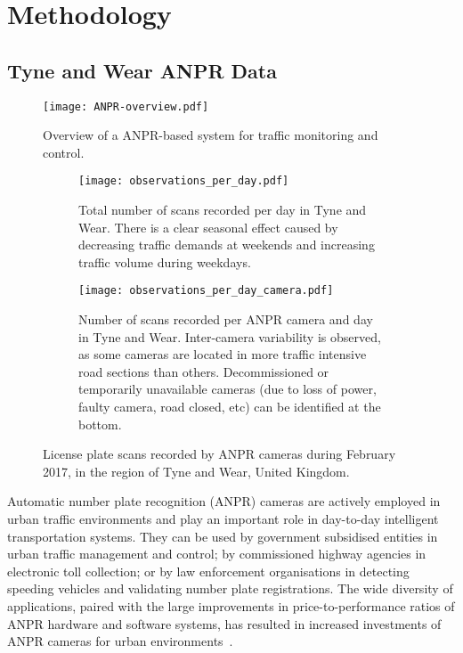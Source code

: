 \section{Methodology}
\subsection{Tyne and Wear ANPR Data}\label{s.ncl}

\begin{figure}[t]
\centering
\texttt{[image: ANPR-overview.pdf]}
\caption{Overview of a ANPR-based system for traffic monitoring and control.}
\label{fig:anpr-overview}
\vspace{-0.25cm}
\end{figure}

\begin{figure*}[!ht]
\centering
\begin{subfigure}[t]{.48\textwidth}
  \centering
  \texttt{[image: observations\_per\_day.pdf]}
  \caption{Total number of scans recorded per day in Tyne and Wear. There is a clear seasonal effect caused by decreasing traffic demands at weekends and increasing traffic volume during weekdays.}
  \label{fig:observations-per-day}
\end{subfigure}\hfill
\begin{subfigure}[t]{.48\textwidth}
  \centering
  \texttt{[image: observations\_per\_day\_camera.pdf]}
  \caption{Number of scans recorded per ANPR camera and day in Tyne and Wear. Inter-camera variability is observed, as some cameras are located in more traffic intensive road sections than others. Decommissioned or temporarily unavailable cameras (due to loss of power, faulty camera, road closed, etc) can be identified at the bottom.}
  \label{fig:observations-per-camera-day}
\end{subfigure}
\caption{License plate scans recorded by ANPR cameras during February 2017, in the region of Tyne and Wear, United Kingdom.}
\label{fig:time-series}
\vspace{-0.4cm}
\end{figure*}

Automatic num\-ber plate recognition (ANPR) cameras are actively employed in urban traffic environments and play an important role in day-to-day intelligent transportation systems. They can be used by government subsidised entities in urban traffic management and control; by commissioned highway agencies in electronic toll collection; or by law enforcement organisations in detecting speeding vehicles and validating number plate registrations. The wide diversity of applications, paired with the large improvements in price-to-performance ratios of ANPR hardware and software systems, has resulted in increased investments of ANPR cameras for urban environments~\cite{EvolutionUTMC2013, SurveyITS2011}.

